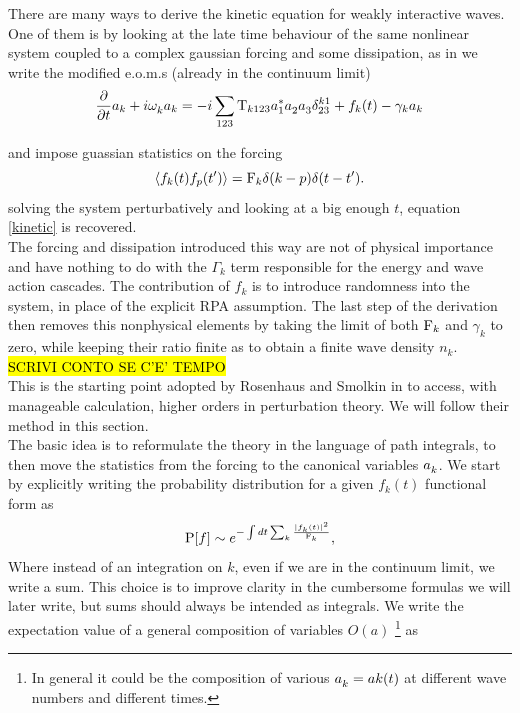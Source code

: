 There are many ways to derive the kinetic equation for weakly interactive waves. One of them is by looking at the late time behaviour of the same nonlinear system
coupled to a complex gaussian forcing and some dissipation, as in \cite{Zakharov1975} we write the modified e.o.m.s (already in the continuum limit)
\begin{equation}
    \frac{\partial}{\partial t} a_k + i \omega^{}_k a_k = -i \sum_{123}\mathrm{T}_{k123} a_1^{*}a_2^{}a_3^{} \delta^{k1}_{23} + f_k(t) - \gamma_k a_k
    \label{eoms}
\end{equation}

and impose guassian statistics on the forcing
\begin{equation}
    \langle f_k(t)f_p(t')\rangle = \mathrm{F}_k \delta(k-p)\delta(t-t').
\end{equation}
solving the system perturbatively and looking at a big enough $t$, equation \eqref{kinetic} is recovered. \\
The forcing and dissipation introduced this way are not of physical importance and have nothing to do with the $\Gamma_k$ term responsible 
for the energy and wave action cascades. The contribution of $f_k$ is to introduce randomness into the system, in place of the explicit RPA assumption. 
The last step of the derivation then removes this nonphysical elements by taking the limit of both $\mathrm{F}_k$ and $\gamma_k$ to zero, while keeping their ratio finite as
to obtain a finite wave density $n_k$. \\  
\hl{SCRIVI CONTO SE C'E' TEMPO} \\
This is the starting point adopted by Rosenhaus and Smolkin in \cite{Rosenhaus2023} to access, with manageable calculation, higher orders in perturbation theory. We will 
follow their method in this section.\\
The basic idea is to reformulate the theory in the language of path integrals, to then move the statistics from the forcing to the canonical variables $a_k^{}$. We start by
explicitly writing the probability distribution for a given $f_k(t)$ functional form as 
\begin{equation}  
    \mathrm{P}[f] \sim e^{-\int dt \sum_k \frac{|f_k(t)|^2}{\mathrm{F}_k}},
\end{equation}
Where instead of an integration on $k$, even if we are in the continuum limit, we write a sum. This choice is to improve clarity in the cumbersome formulas 
we will later write, but sums should always be intended as integrals. We write the expectation value of a general composition of variables $O(a)$ \footnote{
    In general it could be the composition of various $a_k^{} = ak(t)$ at different wave numbers and different times.
} as 
